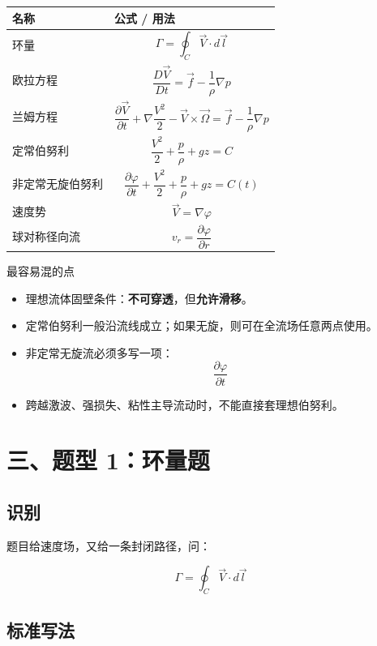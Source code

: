 \documentclass[11pt,a4paper]{ctexart}
\begin{document}
\begin{center}
\begin{tabular}{>{\raggedright\arraybackslash}p{3.5cm} >{\raggedright\arraybackslash}p{8.8cm}}
\toprule
\textbf{名称} & \textbf{公式 / 用法}\\
\midrule
环量 &
\[
\Gamma=\oint_C \vec V\cdot d\vec l
\]
\\
欧拉方程 &
\[
\frac{D\vec V}{Dt}=\vec f-\frac{1}{\rho}\nabla p
\]
\\
兰姆方程 &
\[
\frac{\partial \vec V}{\partial t}
+\nabla\frac{V^2}{2}
-\vec V\times\vec\Omega
=\vec f-\frac{1}{\rho}\nabla p
\]
\\
定常伯努利 &
\[
\frac{V^2}{2}+\frac{p}{\rho}+gz=C
\]
\\
非定常无旋伯努利 &
\[
\frac{\partial\varphi}{\partial t}
+\frac{V^2}{2}
+\frac{p}{\rho}
+gz=C(t)
\]
\\
速度势 &
\[
\vec V=\nabla\varphi
\]
\\
球对称径向流 &
\[
v_r=\frac{\partial\varphi}{\partial r}
\]
\\
\bottomrule
\end{tabular}
\end{center}

\begin{warnbox}{最容易混的点}
\begin{itemize}
  \item 理想流体固壁条件：\textbf{不可穿透}，但\textbf{允许滑移}。
  \item 定常伯努利一般沿流线成立；如果无旋，则可在全流场任意两点使用。
  \item 非定常无旋流必须多写一项：
  \[
  \frac{\partial\varphi}{\partial t}
  \]
  \item 跨越激波、强损失、粘性主导流动时，不能直接套理想伯努利。
\end{itemize}
\end{warnbox}

\section*{三、题型 1：环量题}

\subsection*{识别}

题目给速度场，又给一条封闭路径，问：

\[
\Gamma=\oint_C \vec V\cdot d\vec l
\]

\subsection*{标准写法}
\end{document}
